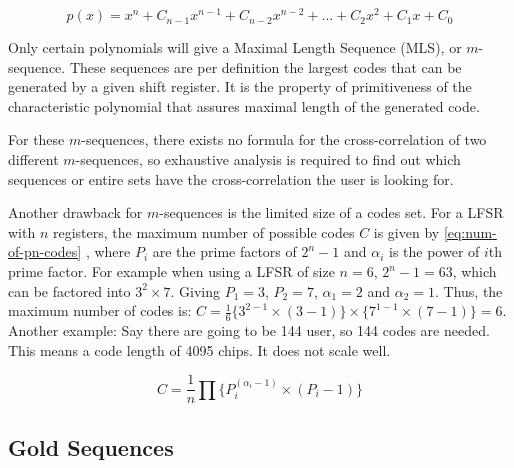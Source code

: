 		\begin{equation}
			\label{eq:lfsr-polynomial}
			p(x) = x^n + C_{n-1} x^{n-1}  + C_{n-2} x^{n-2} + \dotsc + C_{2} x^{2}  + C_{1} x  + C_{0}
		\end{equation}


		Only certain polynomials will give a Maximal Length Sequence (MLS), or $m$-sequence.
		These sequences are per definition the largest codes that can be generated by a given shift register.
		It is the property of primitiveness of the characteristic polynomial that assures maximal length of the generated code. 


		For these $m$-sequences, there exists no formula for the cross-correlation of two different $m$-sequences, so exhaustive analysis is required to find out which sequences or entire sets have the cross-correlation the user is looking for.

		Another drawback for $m$-sequences is the limited size of a codes set.
		For a LFSR with $n$ registers, the maximum number of possible codes $C$ is given by \autoref{eq:num-of-pn-codes} \cite{mutagi1996pseudo}, where $P_i$ are the prime factors of $2^n - 1$ and $\alpha_i$ is the power of $i$th prime factor.
		For example when using a LFSR of size $n = 6$, $2^n - 1 = 63$, which can be factored into $3^2 \times 7$.
		Giving $P_1 = 3$, $P_2 = 7$, $\alpha_1 = 2$ and $\alpha_2 = 1$.
		Thus, the maximum number of codes is: $C = \frac{1}{6} \{ 3^{2 - 1} \times (3 - 1) \} \times \{ 7^{1 - 1} \times (7 - 1) \} = 6$.
		Another example: Say there are going to be 144 user, so 144 codes are needed. 
		This means a code length of 4095 chips.
		It does not scale well.

		\begin{equation}
			\label{eq:num-of-pn-codes}
			C = \frac{1}{n} \prod \{ P_{i} ^ {(\alpha_i - 1)} \times (P_i - 1) \}
		\end{equation}

	\subsection{Gold Sequences}
	\label{subsec:gold-theory}

